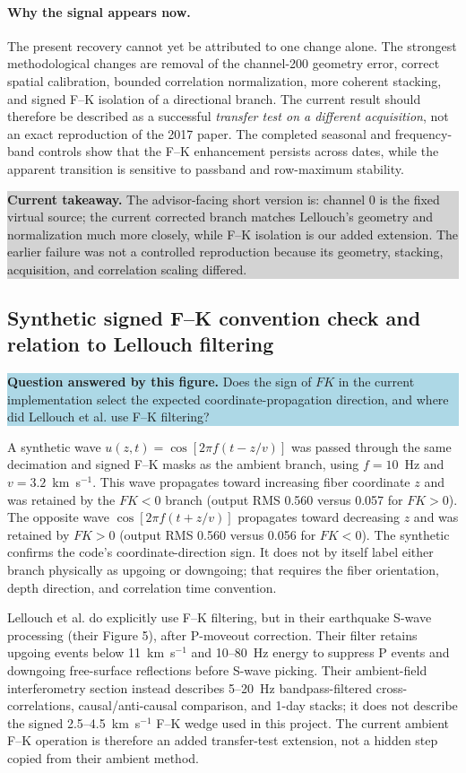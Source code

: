 \documentclass[11pt]{article}
\newcommand{\figquestion}[1]{\par\medskip\noindent\colorbox{lightblue}{\parbox{0.95\linewidth}{\textcolor{questionblue}{\textbf{Question answered by this figure.}} #1}}\par\medskip}
\newcommand{\takeaway}[1]{\par\smallskip\noindent\colorbox{lightgray}{\parbox{0.95\linewidth}{\textbf{Current takeaway.} #1}}\par\medskip}
\begin{document}
\paragraph{Why the signal appears now.} The present recovery cannot yet be attributed to one change alone. The strongest methodological changes are removal of the channel-200 geometry error, correct spatial calibration, bounded correlation normalization, more coherent stacking, and signed F--K isolation of a directional branch. The current result should therefore be described as a successful \emph{transfer test on a different acquisition}, not an exact reproduction of the 2017 paper. The completed seasonal and frequency-band controls show that the F--K enhancement persists across dates, while the apparent transition is sensitive to passband and row-maximum stability.

\takeaway{The advisor-facing short version is: channel 0 is the fixed virtual source; the current corrected branch matches Lellouch's geometry and normalization much more closely, while F--K isolation is our added extension. The earlier failure was not a controlled reproduction because its geometry, stacking, acquisition, and correlation scaling differed.}


\subsection{Synthetic signed F--K convention check and relation to Lellouch filtering}
\figquestion{Does the sign of $F K$ in the current implementation select the expected coordinate-propagation direction, and where did Lellouch et al. use F--K filtering?}

A synthetic wave $u(z,t)=\cos[2\pi f(t-z/v)]$ was passed through the same decimation and signed F--K masks as the ambient branch, using $f=10$~Hz and $v=3.2$~km~s$^{-1}$. This wave propagates toward increasing fiber coordinate $z$ and was retained by the $F K<0$ branch (output RMS 0.560 versus 0.057 for $F K>0$). The opposite wave $\cos[2\pi f(t+z/v)]$ propagates toward decreasing $z$ and was retained by $F K>0$ (output RMS 0.560 versus 0.056 for $F K<0$). The synthetic confirms the code's coordinate-direction sign. It does not by itself label either branch physically as upgoing or downgoing; that requires the fiber orientation, depth direction, and correlation time convention.

Lellouch et al. do explicitly use F--K filtering, but in their earthquake S-wave processing (their Figure 5), after P-moveout correction. Their filter retains upgoing events below 11~km~s$^{-1}$ and 10--80~Hz energy to suppress P events and downgoing free-surface reflections before S-wave picking. Their ambient-field interferometry section instead describes 5--20~Hz bandpass-filtered cross-correlations, causal/anti-causal comparison, and 1-day stacks; it does not describe the signed 2.5--4.5~km~s$^{-1}$ F--K wedge used in this project. The current ambient F--K operation is therefore an added transfer-test extension, not a hidden step copied from their ambient method.
\end{document}
